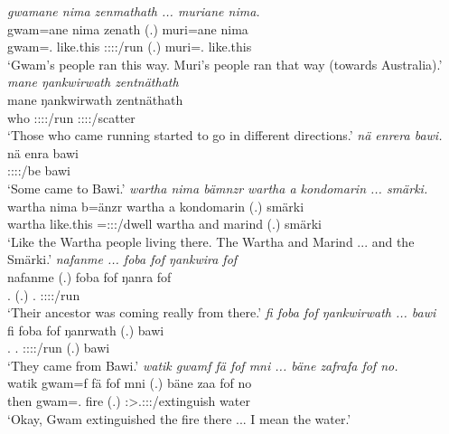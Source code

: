 \begin{exe}
	\emph{gwamane nima zenmathath ... muriane nima.}\\
	\gll gwam=ane nima zenath (.) muri=ane nima\\ 
	gwam=\Poss.\Sg{} like.this \Stpl:\Sbj:\Pst:\Pfv:\Venit/run (.) muri=\Poss.\Sg{} like.this\\
	\trans `Gwam's people ran this way. Muri's people ran that way (towards Australia).'
	\emph{mane ŋankwirwath zentnäthath}\\
	\gll mane ŋankwirwath zentnäthath\\ 
	who \Stpl:\Sbj:\Pst:\Ipfv:\Venit/run \Stpl:\Sbj:\Pst:\Pfv:\Venit/scatter\\
	\trans `Those who came running started to go in different directions.'
	\emph{nä enrera bawi.}\\
	\gll nä enra bawi\\ 
	\Indf{} \Sg:\Sbj:\Pst:\Ipfv:\Venit/be bawi\\
	\trans `Some came to Bawi.'
	\emph{wartha nima bämnzr wartha a kondomarin ... smärki.}\\
	\gll wartha nima b=änzr wartha a kondomarin (.) smärki\\ 
	wartha like.this \Med=\Stpl:\Sbj:\Nonpast:\Ipfv/dwell wartha and marind (.) smärki\\
	\trans `Like the Wartha people living there. The Wartha and Marind ... and the Smärki.'
	\emph{nafanme ... foba fof ŋankwira fof}\\
	\gll nafanme (.) foba fof ŋanra fof\\ 
	\Tnsg.\Poss{} (.) \Dist.\Abl{} \Emph{} \Sg:\Sbj:\Pst:\Ipfv:\Venit/run \Emph{}\\
	\trans `Their ancestor was coming really from there.'
	\emph{fi foba fof ŋankwirwath ... bawi}\\
	\gll fi foba fof ŋanrwath (.) bawi\\ 
	\Third.\Abs{} \Dist.\Abl{} \Emph{} \Stpl:\Sbj:\Pst:\Ipfv:\Venit/run (.) bawi\\
	\trans `They came from Bawi.'
	\emph{watik gwamf fä fof mni ... bäne zafrafa fof no.}\\
	\gll watik gwam=f fä fof mni (.) bäne zaa fof no\\ 
	then gwam=\Erg.\Sg{} \Dist{} \Emph{} fire (.) \Recog{} \Sg:\Sbj>\Tsg.\F:\Obj:\Pst:\Pfv/extinguish \Emph{} water\\
	\trans `Okay, Gwam extinguished the fire there ... I mean the water.'

\end{exe}
